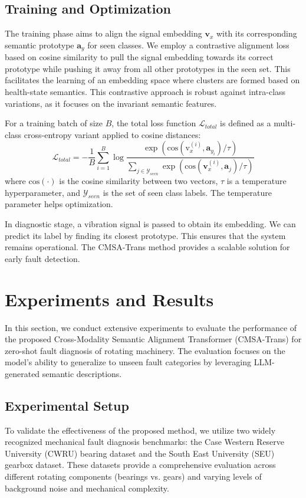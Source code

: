 \documentclass[journal]{IEEEtran}
\begin{document}
\subsection{Training and Optimization}
The training phase aims to align the signal embedding $\mathbf{v}_x$ with its corresponding semantic prototype $\mathbf{a}_{y}$ for seen classes. We employ a contrastive alignment loss \cite{chen2020simclr} based on cosine similarity to pull the signal embedding towards its correct prototype while pushing it away from all other prototypes in the seen set. This facilitates the learning of an embedding space where clusters are formed based on health-state semantics. This contrastive approach is robust against intra-class variations, as it focuses on the invariant semantic features.

For a training batch of size $B$, the total loss function $\mathcal{L}_{total}$ is defined as a multi-class cross-entropy variant applied to cosine distances:
\begin{equation}
\mathcal{L}_{total} = -\frac{1}{B} \sum_{i=1}^{B} \log \frac{\exp(\text{cos}(\text{v}_x^{(i)}, \mathbf{a}_{y_i}) / \tau)}{\sum_{j \in \mathcal{Y}_{seen}} \exp(\text{cos}(\mathbf{v}_x^{(i)}, \mathbf{a}_j) / \tau)}
\end{equation}
where $\text{cos}(\cdot)$ is the cosine similarity between two vectors, $\tau$ is a temperature hyperparameter, and $\mathcal{Y}_{seen}$ is the set of seen class labels. The temperature parameter helps optimization.

In diagnostic stage, a vibration signal is passed to obtain its embedding. We can predict its label by finding its closest prototype. This ensures that the system remains operational. The CMSA-Trans method provides a scalable solution for early fault detection.


\section{Experiments and Results}
In this section, we conduct extensive experiments to evaluate the performance of the proposed Cross-Modality Semantic Alignment Transformer (CMSA-Trans) for zero-shot fault diagnosis of rotating machinery. The evaluation focuses on the model's ability to generalize to unseen fault categories by leveraging LLM-generated semantic descriptions.

\subsection{Experimental Setup}
To validate the effectiveness of the proposed method, we utilize two widely recognized mechanical fault diagnosis benchmarks: the Case Western Reserve University (CWRU) bearing dataset and the South East University (SEU) gearbox dataset. These datasets provide a comprehensive evaluation across different rotating components (bearings vs. gears) and varying levels of background noise and mechanical complexity.
\end{document}
